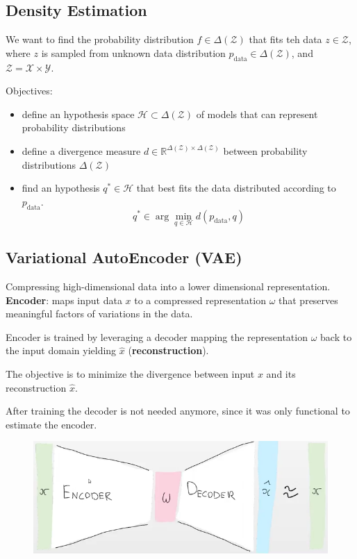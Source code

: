 \documentclass[a4paper,6pt,twocolumn,fleqn]{article}
\begin{document}
\subsection{Density Estimation} %
We want to find the probability distribution \(f \in \Delta (\mathcal Z)\) that fits teh data \(z \in \mathcal Z\), where \(z\) is sampled from unknown data distribution \(p_\text{data} \in \Delta (\mathcal Z)\), and \(\mathcal Z = \mathcal X \times \mathcal Y\).

Objectives:
\begin{itemize}
    \item define an hypothesis space \(\mathcal H \subset \Delta(\mathcal Z)\) of models that can represent probability distributions
    \item define a divergence measure \(d \in \mathbb R^{\Delta (\mathcal Z) \times \Delta (\mathcal Z)}\) between probability distributions \(\Delta (\mathcal Z)\)
    \item find an hypothesis \(q^* \in \mathcal H\) that best fits the data distributed according to \(p_\text{data}\).
    \begin{equation}
        q^* \in \arg \min_{q \in \mathcal H} d(p_\text{data}, q)
    \end{equation}
\end{itemize}
\subsection{Variational AutoEncoder (VAE)} %
Compressing high-dimensional data into a lower dimensional representation.
\textbf{Encoder}: maps input data \(x\) to a compressed representation \(\omega\) that preserves meaningful factors of variations in the data.

Encoder is trained by leveraging a decoder mapping the representation \(\omega\) back to the input domain yielding \(\hat x\) (\textbf{reconstruction}).

The objective is to minimize the divergence between input \(x\) and its reconstruction \(\hat x\).

After training the decoder is not needed anymore, since it was only functional to estimate the encoder.

\begin{figure}[h!]
    \vspace{-10pt}
	\begin{center}
    \includegraphics[width=.4\textwidth]{083}
    \end{center}
    \vspace{-20pt}
\end{figure}
\end{document}
